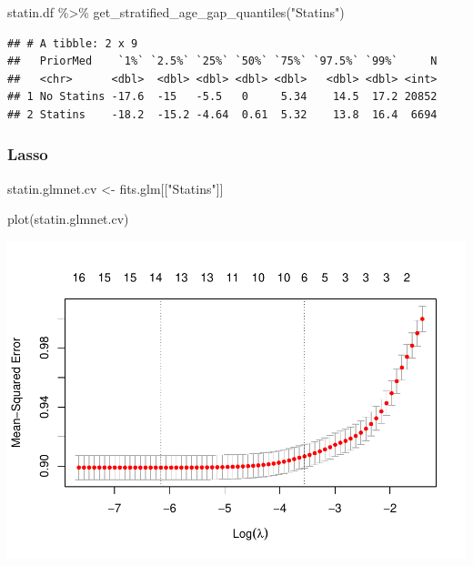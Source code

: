 \documentclass[
]{article}
\newenvironment{Shaded}{\begin{snugshade}}{\end{snugshade}}
\newcommand{\FunctionTok}[1]{\textcolor[rgb]{0.00,0.00,0.00}{#1}}
\newcommand{\NormalTok}[1]{#1}
\newcommand{\OtherTok}[1]{\textcolor[rgb]{0.56,0.35,0.01}{#1}}
\newcommand{\SpecialCharTok}[1]{\textcolor[rgb]{0.00,0.00,0.00}{#1}}
\newcommand{\StringTok}[1]{\textcolor[rgb]{0.31,0.60,0.02}{#1}}
\begin{document}
\begin{Shaded}
\begin{Highlighting}[]
\NormalTok{statin.df }\SpecialCharTok{\%\textgreater{}\%} 
  \FunctionTok{get\_stratified\_age\_gap\_quantiles}\NormalTok{(}\StringTok{"Statins"}\NormalTok{)}
\end{Highlighting}
\end{Shaded}

\begin{verbatim}
## # A tibble: 2 x 9
##   PriorMed    `1%` `2.5%` `25%` `50%` `75%` `97.5%` `99%`     N
##   <chr>      <dbl>  <dbl> <dbl> <dbl> <dbl>   <dbl> <dbl> <int>
## 1 No Statins -17.6  -15   -5.5   0     5.34    14.5  17.2 20852
## 2 Statins    -18.2  -15.2 -4.64  0.61  5.32    13.8  16.4  6694
\end{verbatim}

\hypertarget{lasso}{%
\subsubsection{Lasso}\label{lasso}}

\begin{Shaded}
\begin{Highlighting}[]
\NormalTok{statin.glmnet.cv }\OtherTok{\textless{}{-}}\NormalTok{ fits.glm[[}\StringTok{"Statins"}\NormalTok{]]}
\end{Highlighting}
\end{Shaded}

\begin{Shaded}
\begin{Highlighting}[]
\FunctionTok{plot}\NormalTok{(statin.glmnet.cv) }
\end{Highlighting}
\end{Shaded}

\includegraphics{../results/report_files/figure-latex/statin-lasso-plot-1.pdf}
\end{document}
